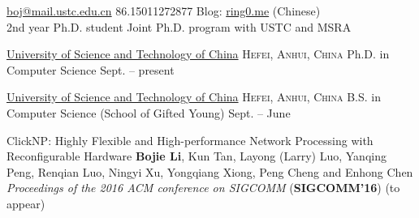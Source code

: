 \documentclass[10pt,a4paper]{article}
\begin{document}
\sloppy  %



\nobreakvspace{0.3em}  %

\noindent\href{mailto:boj@mail.ustc.edu.cn}{boj\mbox{}@\mbox{}mail.ustc.edu.cn}\sbull
\textsmaller{+}86.15011272877\sbull
Blog: \href{https://ring0.me/}{ring0.me} (Chinese)
\\
\noindent 2nd year Ph.D. student\sbull
Joint Ph.D. program with USTC and MSRA


\spacedhrule{0.8em}{-0.8em}  %


\headedsection  %
{\href{http://ustc.edu.cn}{University of Science and Technology of China}}
{\textsc{Hefei, Anhui, China}} {%
	\headedsubsection
	{Ph.D. in Computer Science}
	{Sept.  -- present}
	{}
}

\headedsection  %
{\href{http://ustc.edu.cn}{University of Science and Technology of China}}
{\textsc{Hefei, Anhui, China}} {%
	\headedsubsection
	{B.S. in Computer Science (School of Gifted Young)}
	{Sept.  -- June }
	{}
}

\spacedhrule{0.5em}{-0.8em}



\spacedhrule{1.0em}{-0.8em}


\inlineheadsection
{ClickNP: Highly Flexible and High-performance Network Processing with Reconfigurable Hardware}
{\textbf{Bojie Li}, Kun Tan, Layong (Larry) Luo, Yanqing Peng, Renqian Luo, Ningyi Xu, Yongqiang Xiong, Peng Cheng and Enhong Chen \\
\textit{Proceedings of the 2016 ACM conference on SIGCOMM} (\textbf{SIGCOMM'16}) (to appear)
}
\end{document}
